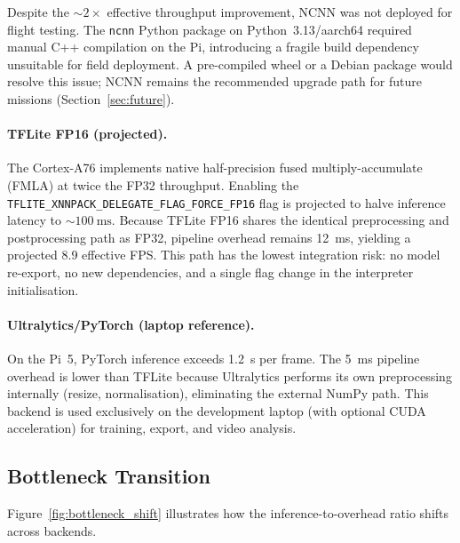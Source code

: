 Despite the ${\sim}2\times$ effective throughput improvement, NCNN was not deployed for flight testing.  The \texttt{ncnn} Python package on Python~3.13/aarch64 required manual C++ compilation on the Pi, introducing a fragile build dependency unsuitable for field deployment.  A pre-compiled wheel or a Debian package would resolve this issue; NCNN remains the recommended upgrade path for future missions (Section~\ref{sec:future}).

\paragraph{TFLite FP16 (projected).}
The Cortex-A76 implements native half-precision fused multiply-accumulate (FMLA) at twice the FP32 throughput.  Enabling the \texttt{TFLITE\_XNNPACK\_DELEGATE\_FLAG\_FORCE\_FP16} flag is projected to halve inference latency to ${\sim}\SI{100}{\milli\second}$.  Because TFLite FP16 shares the identical preprocessing and postprocessing path as FP32, pipeline overhead remains \SI{12}{\milli\second}, yielding a projected 8.9 effective FPS.  This path has the lowest integration risk: no model re-export, no new dependencies, and a single flag change in the interpreter initialisation.

\paragraph{Ultralytics/PyTorch (laptop reference).}
On the Pi~5, PyTorch inference exceeds \SI{1.2}{\second} per frame.  The \SI{5}{\milli\second} pipeline overhead is lower than TFLite because Ultralytics performs its own preprocessing internally (resize, normalisation), eliminating the external NumPy path.  This backend is used exclusively on the development laptop (with optional CUDA acceleration) for training, export, and video analysis.

\subsection{Bottleneck Transition}\label{sec:cv:pipeline-fps:bottleneck}

Figure~\ref{fig:bottleneck_shift} illustrates how the inference-to-overhead ratio shifts across backends.


